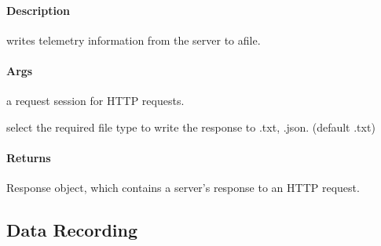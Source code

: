 \documentclass[letterpaper,10pt,english]{sphinxmanual}
\begin{document}
\begin{fulllineitems}
\label{\detokenize{gemini_event_zone_API:gemini_event_zone_API.get_event_zone_telemetry}}
\pysigstartsignatures
{}
\pysigstopsignatures

\paragraph{Description}
\label{\detokenize{gemini_event_zone_API:id8}}
\sphinxAtStartPar
writes telemetry information from the server to afile.


\paragraph{Args}
\label{\detokenize{gemini_event_zone_API:id9}}\begin{description}
\sphinxAtStartPar
a request session for HTTP requests.

\sphinxAtStartPar
select the required file type to write the response to .txt, .json. (default .txt)

\end{description}


\paragraph{Returns}
\label{\detokenize{gemini_event_zone_API:id10}}\begin{description}
\sphinxAtStartPar
Response object, which contains a server’s response to an HTTP request.

\end{description}

\end{fulllineitems}


\sphinxstepscope


\subsection{Data Recording}
\label{\detokenize{gemini_data_recording:data-recording}}\label{\detokenize{gemini_data_recording::doc}}
\end{document}
